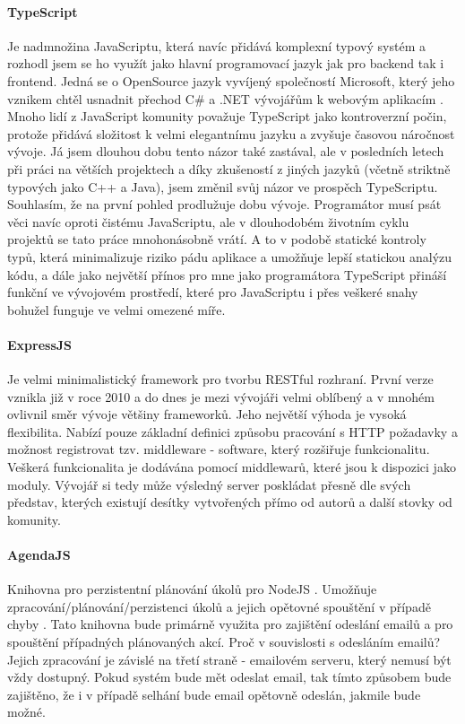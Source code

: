 \paragraph{TypeScript} Je nadmnožina JavaScriptu, která navíc přidává komplexní typový systém \cite{ts} a rozhodl jsem se ho využít jako hlavní programovací jazyk jak pro backend tak i frontend. Jedná se o OpenSource jazyk vyvíjený společností Microsoft, který jeho vznikem chtěl usnadnit přechod C\# a .NET vývojářům k webovým aplikacím \cite{ts}. Mnoho lidí z JavaScript komunity považuje TypeScript jako kontroverzní počin, protože přidává složitost k velmi elegantnímu jazyku a zvyšuje časovou náročnost vývoje. Já jsem dlouhou dobu tento názor také zastával, ale v posledních letech při práci na větších projektech a díky zkušeností z jiných jazyků (včetně striktně typových jako C++ a Java), jsem změnil svůj názor ve prospěch TypeScriptu. Souhlasím, že na první pohled prodlužuje dobu vývoje. Programátor musí psát věci navíc oproti čistému JavaScriptu, ale v dlouhodobém životním cyklu projektů se tato práce  mnohonásobně vrátí. A to v podobě statické kontroly typů, která minimalizuje riziko pádu aplikace a umožňuje  lepší statickou analýzu kódu, a dále jako největší přínos pro mne jako programátora TypeScript přináší funkční  ve vývojovém prostředí, které pro JavaScriptu i přes veškeré snahy bohužel funguje ve velmi omezené míře.

\paragraph{ExpressJS}\label{expressjs} Je velmi minimalistický framework pro tvorbu RESTful rozhraní. První verze vznikla již v roce 2010 a do dnes je mezi vývojáři velmi oblíbený a v mnohém ovlivnil směr vývoje většiny frameworků. Jeho největší výhoda je vysoká flexibilita. Nabízí pouze základní definici způsobu pracování s HTTP požadavky a možnost registrovat tzv. middleware - software, který rozšiřuje funkcionalitu. Veškerá funkcionalita je dodávána pomocí middlewarů, které jsou k dispozici jako moduly. Vývojář si tedy může výsledný server poskládat přesně dle svých představ, kterých existují desítky vytvořených přímo od autorů a další stovky od komunity. \cite{expressjs}


\paragraph{AgendaJS} Knihovna pro perzistentní plánování úkolů pro NodeJS \cite{agendajs}. Umožňuje zpracování/plánování/perzistenci úkolů a jejich opětovné spouštění v případě chyby \cite{agendajs}. Tato knihovna bude primárně využita pro zajištění odeslání emailů a pro spouštění případných plánovaných akcí. Proč v souvislosti s odesláním emailů? Jejich zpracování je závislé na třetí straně - emailovém serveru, který nemusí být vždy dostupný. Pokud systém bude mět odeslat email, tak tímto způsobem bude zajištěno, že i v případě selhání bude email opětovně odeslán, jakmile bude možné.

